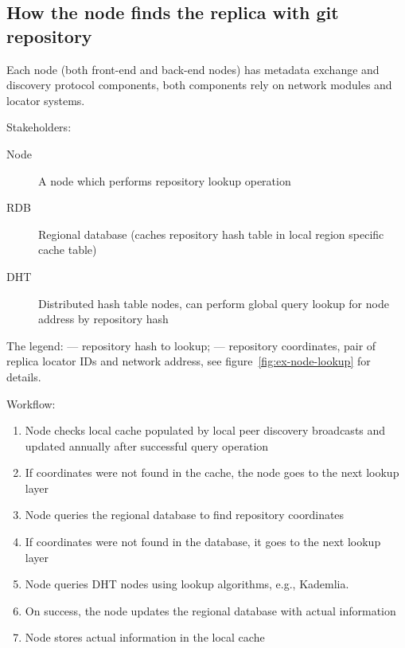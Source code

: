 \subsection{How the node finds the replica with git repository}

Each node (both front-end and back-end nodes) has metadata exchange and discovery protocol components,
both components rely on network modules and locator systems.

Stakeholders:
\begin{description}
  \item[Node] A node which performs repository lookup operation
  \item[RDB] Regional database (caches repository hash table in local region specific cache table)
  \item[DHT] Distributed hash table nodes, can perform global query lookup for node address by repository hash
\end{description}

The legend:  --- repository hash to lookup;  --- repository coordinates,
pair of replica locator IDs and network address, see figure~\ref{fig:ex-node-lookup} for details.

Workflow:
\begin{enumerate}
    \item Node checks local cache populated by local peer discovery broadcasts
      and updated annually after successful query operation
    \item If coordinates were not found in the cache, the node goes to the next lookup layer
    \item Node queries the regional database to find repository coordinates
    \item If coordinates were not found in the database, it goes to the next lookup layer
    \item Node queries DHT nodes using lookup algorithms, e.g., Kademlia.
    \item On success, the node updates the regional database with actual information
    \item Node stores actual information in the local cache
\end{enumerate}

